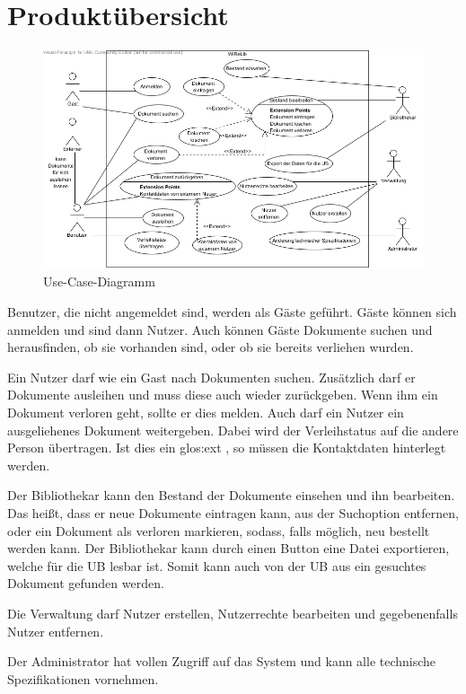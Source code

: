 \chapter{Produktübersicht}

\begin{figure}[h]
\centering
\label{use-case}
\includegraphics[width=0.8\linewidth]{bilder/use-case.png}
\caption[Use-Case-Diagramm]{Use-Case-Diagramm}
\end{figure}


Benutzer, die nicht angemeldet sind, werden als Gäste geführt.
Gäste können sich anmelden und sind dann Nutzer.
Auch können Gäste Dokumente suchen und herausfinden, ob sie vorhanden sind, oder ob sie bereits verliehen wurden.

Ein Nutzer darf wie ein Gast nach Dokumenten suchen.
Zusätzlich darf er Dokumente ausleihen und muss diese auch wieder zurückgeben.
Wenn ihm ein Dokument verloren geht, sollte er dies melden.
Auch darf ein Nutzer ein ausgeliehenes Dokument weitergeben.
Dabei wird der Verleihstatus auf die andere Person übertragen.
Ist dies ein \gls{glos:ext} , so müssen die Kontaktdaten hinterlegt werden.

Der Bibliothekar kann den Bestand der Dokumente einsehen und ihn bearbeiten.
Das heißt, dass er neue Dokumente eintragen kann, aus der Suchoption entfernen, oder ein Dokument als verloren markieren, sodass, falls möglich, neu bestellt werden kann.
Der Bibliothekar kann durch einen Button eine Datei exportieren, welche für die \gls{UB} lesbar ist.
Somit kann auch von der \gls{UB} aus ein gesuchtes Dokument gefunden werden.

Die Verwaltung darf Nutzer erstellen, Nutzerrechte bearbeiten und gegebenenfalls Nutzer entfernen.

Der Administrator hat vollen Zugriff auf das System und kann alle technische Spezifikationen vornehmen.